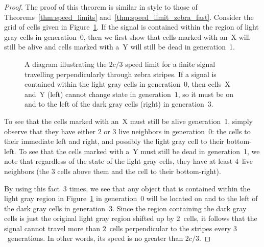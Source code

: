 \begin{proof}
	The proof of this theorem is similar in style to those of Theorems~\ref{thm:speed_limits} and~\ref{thm:speed_limit_zebra_fast}. Consider the grid of cells given in Figure~\ref{fig:speed_limit_zebra}. If the signal is contained within the region of light gray cells in generation~0, then we first show that cells marked with an~X will still be alive and cells marked with a~Y will still be dead in generation~1.
	
	\begin{figure}[!htb]
		\centering
		\begin{minipage}{.44\textwidth}
			\centering{}
		\end{minipage} \quad %
		\begin{minipage}{.52\textwidth}
			\centering{}
		\end{minipage}
		\caption{A diagram illustrating the $2c/3$ speed limit for a finite signal travelling perpendicularly through zebra stripes. If a signal is contained within the light gray cells in generation~$0$, then cells~X and~Y (left) cannot change state in generation~$1$, so it must be on and to the left of the dark gray cells (right) in generation~$3$.}\label{fig:speed_limit_zebra}
	\end{figure}
	
	To see that the cells marked with an~X must still be alive generation~1, simply observe that they have either $2$ or $3$ live neighbors in generation~0: the cells to their immediate left and right, and possibly the light gray cell to their bottom-left. To see that the cells marked with a~Y must still be dead in generation~1, we note that regardless of the state of the light gray cells, they have at least $4$~live neighbors (the $3$ cells above them and the cell to their bottom-right).
	
	By using this fact~$3$ times, we see that any object that is contained within the light gray region in Figure~\ref{fig:speed_limit_zebra} in generation~0 will be located on and to the left of the dark gray cells in generation~3. Since the region containing the dark gray cells is just the original light gray region shifted up by $2$~cells, it follows that the signal cannot travel more than $2$~cells perpendicular to the stripes every $3$~generations. In other words, its speed is no greater than $2c/3$.
\end{proof}

